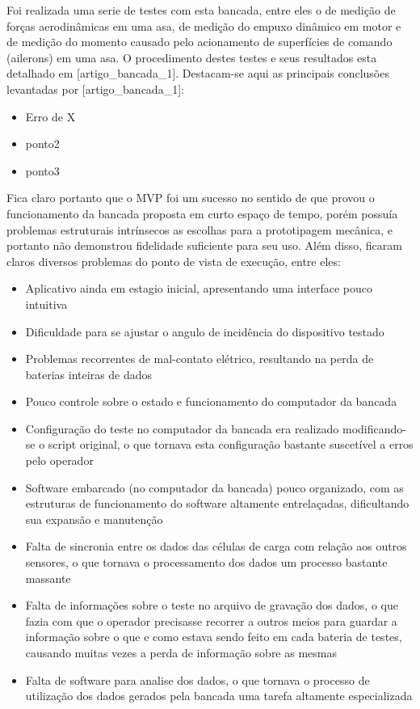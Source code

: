 Foi realizada uma serie de testes com esta bancada, entre eles o de medição de forças aerodinâmicas em uma asa, de medição do empuxo dinâmico em motor e de medição do momento causado pelo acionamento de superfícies de comando (ailerons) em uma asa. O procedimento destes testes e seus resultados esta detalhado em [artigo_bancada_1]. Destacam-se aqui as principais conclusões levantadas por [artigo_bancada_1]:

\begin{itemize}
    \item Erro de X%
    \item ponto2
    \item ponto3
\end{itemize}

Fica claro portanto que o MVP foi um sucesso no sentido de que provou o funcionamento da bancada proposta em curto espaço de tempo, porém possuía problemas estruturais intrínsecos as escolhas para a prototipagem mecânica, e portanto não demonstrou fidelidade suficiente para seu uso. Além disso, ficaram claros diversos problemas do ponto de vista de execução, entre eles:

\begin{itemize}
    \item Aplicativo ainda em estagio inicial, apresentando uma interface pouco intuitiva
    \item Dificuldade para se ajustar o angulo de incidência do dispositivo testado
    \item Problemas recorrentes de mal-contato elétrico, resultando na perda de baterias inteiras de dados
    \item Pouco controle sobre o estado e funcionamento do computador da bancada
    \item Configuração do teste no computador da bancada era realizado modificando-se o script original, o que tornava esta configuração bastante suscetível a erros pelo operador 
    \item Software embarcado (no computador da bancada) pouco organizado, com as estruturas de funcionamento do software altamente entrelaçadas, dificultando sua expansão e manutenção
    \item Falta de sincronia entre os dados das células de carga com relação aos outros sensores, o que tornava o processamento dos dados um processo bastante massante
    \item Falta de informações sobre o teste no arquivo de gravação dos dados, o que fazia com que o operador precisasse recorrer a outros meios para guardar a informação sobre o que e como estava sendo feito em cada bateria de testes, causando muitas vezes a perda de informação sobre as mesmas
    \item Falta de software para analise dos dados, o que tornava o processo de utilização dos dados gerados pela bancada uma tarefa altamente especializada
\end{itemize}

